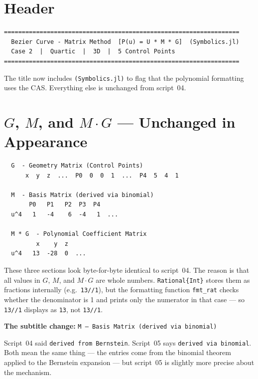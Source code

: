 \documentclass[12pt, a4paper]{article}
\newcommand{\cd}[1]{\texttt{#1}}
\begin{document}
\section{Header}

\begin{verbatim}
==================================================================
  Bezier Curve - Matrix Method  [P(u) = U * M * G]  (Symbolics.jl)
  Case 2  |  Quartic  |  3D  |  5 Control Points
==================================================================
\end{verbatim}

The title now includes \cd{(Symbolics.jl)} to flag
that the polynomial formatting uses the CAS.
Everything else is unchanged from script~04.


\section{$G$, $M$, and $M \cdot G$ --- Unchanged in Appearance}

\begin{verbatim}
  G  - Geometry Matrix (Control Points)
      x  y  z  ...  P0  0  0  1  ...  P4  5  4  1

  M  - Basis Matrix (derived via binomial)
       P0   P1   P2  P3  P4
  u^4   1   -4    6  -4   1  ...

  M * G  - Polynomial Coefficient Matrix
         x    y  z
  u^4   13  -28  0  ...
\end{verbatim}

These three sections look byte-for-byte identical to script~04.
The reason is that all values in $G$, $M$, and $M \cdot G$
are whole numbers.
\cd{Rational\{Int\}} stores them as fractions internally
(e.g.\ \cd{13//1}), but the formatting function \cd{fmt\_rat}
checks whether the denominator is 1 and prints only the
numerator in that case --- so \cd{13//1} displays as \cd{13},
not \cd{13//1}.

\begin{notebox}
\textbf{The subtitle change:} \cd{M --- Basis Matrix (derived via binomial)}

Script~04 said \cd{derived from Bernstein}.
Script~05 says \cd{derived via binomial}.
Both mean the same thing --- the entries come from the
binomial theorem applied to the Bernstein expansion ---
but script~05 is slightly more precise about the mechanism.
\end{notebox}
\end{document}
